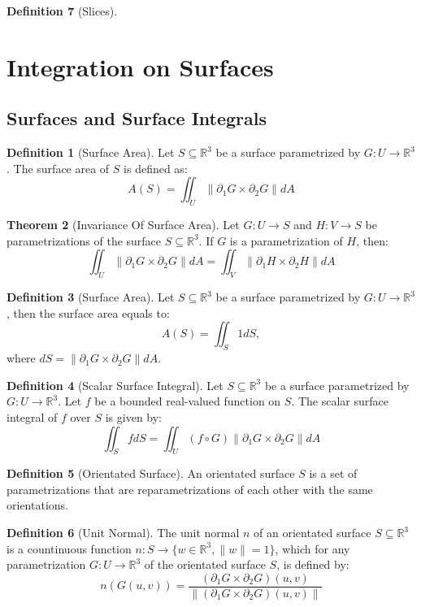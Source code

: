 \documentclass[12pt]{article}
\theoremstyle{definition}
\newtheorem{definition}{Definition}[subsection]
\newtheorem{theorem}[definition]{Theorem}
\theoremstyle{remark}
\begin{document}
\begin{definition}[Slices]
\section{Integration on Surfaces}
\subsection{Surfaces and Surface Integrals}
\begin{definition}[Surface Area]
Let $S\subseteq\mathbb{R}^3$ be a surface parametrized by $G:U\to\mathbb{R}^3$. The surface area of $S$ is defined as:
\[
A(S)=\iint_U\|\partial _1 G\times\partial_2 G\|dA
\]
\end{definition}

\begin{theorem}[Invariance Of Surface Area]
Let $G:U\to S$ and $H:V\to S$ be parametrizations of the surface $S\subseteq\mathbb{R}^3$. If $G$ is a parametrization of $H$, then:
\[
\iint_U\|\partial_1 G\times\partial_2 G\|dA=\iint_V\|\partial_1 H\times\partial_2 H\|dA
\]
\end{theorem}

\begin{definition}[Surface Area]
Let $S\subseteq\mathbb{R}^3$ be a surface parametrized by $G:U\to\mathbb{R}^3$, then the surface area equals to:
\[
A(S)=\iint_S1dS,
\]
where $dS=\|\partial_1 G\times\partial_2 G\|dA.$
\end{definition}

\begin{definition}[Scalar Surface Integral]
Let $S\subseteq\mathbb{R}^3$ be a surface parametrized by $G:U\to\mathbb{R}^3$. Let $f$ be a bounded real-valued function on $S$. The scalar surface integral of $f$ over $S$ is given by:
\[
\iint_S fdS=\iint_U (f\circ G)\|\partial_1G\times\partial_2 G\|dA
\]
\end{definition}

\begin{definition}[Orientated Surface]
An orientated surface $S$ is a set of parametrizations that are reparametrizations of each other with the same orientations.
\end{definition}

\begin{definition}[Unit Normal]
The unit normal $n$ of an orientated surface $S\subseteq\mathbb{R}^3$ is a countinuous function $n:S\to\{w\in\mathbb{R}^3, \|w\|=1\}$, which for any parametrization $G:U\to\mathbb{R}^3$ of the orientated surface $S$, is defined by:
\[
n(G(u,v))=\frac{(\partial_1 G\times\partial_2 G)(u,v)}{\|(\partial_1 G\times\partial_2 G)(u,v)\|}
\]
\end{definition}


\end{definition}
\end{document}
